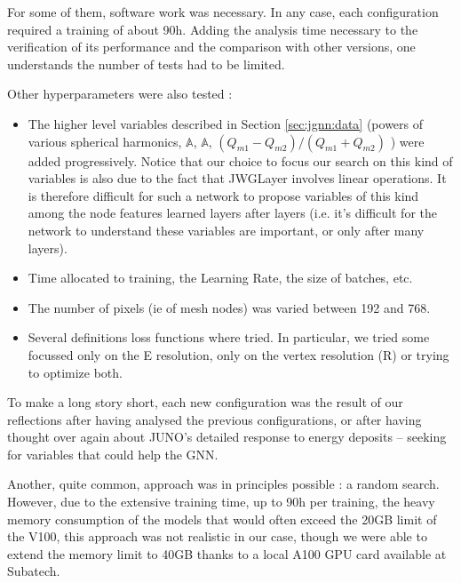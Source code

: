\documentclass[../main.tex]{subfiles}
\begin{document}
\hfill

For some of them, software work was necessary. In any case, each configuration required a training of about 90h. Adding the analysis time necessary to the verification of its performance and the comparison with other versions, one understands the number of tests had to be limited.

Other hyperparameters were also tested :

\begin{itemize}

  \item The higher level variables described in Section \ref{sec:jgnn:data} (powers of various spherical harmonics, $\mathbb{A}$, $\mathbb{A}$, $(Q_{m1}-Q_{m2})/(Q_{m1}+Q_{m2})$ ) were added progressively. Notice that our choice to focus our search on this kind of variables is also due to the fact that JWGLayer involves linear operations. It is therefore difficult for such a network to propose variables of this kind among the node features learned layers after layers (i.e. it's difficult for the network to understand these variables are important, or only after many layers).


  \item Time allocated to training, the Learning Rate, the size of
    batches, etc.

  \item The number of pixels (ie of mesh nodes) was varied between 192 and 768.

  \item Several definitions  loss functions where tried. In particular, we tried some focussed only on the E resolution, only on the vertex resolution (R) or trying to optimize both.
\end{itemize}

\hfill

To make a long story short, each new configuration was the result of our reflections after having analysed the previous configurations, or  after having thought over again about JUNO's detailed response to energy deposits -- seeking for variables that could help the GNN.

Another, quite common, approach  was in principles possible : a random search. However, due to the extensive training time, up to 90h per training, the heavy memory consumption of the models that would often exceed the 20GB limit of the V100, this approach was not realistic in our case, though we were able to extend the memory limit to 40GB thanks to a local A100 GPU card available at Subatech.
\end{document}
